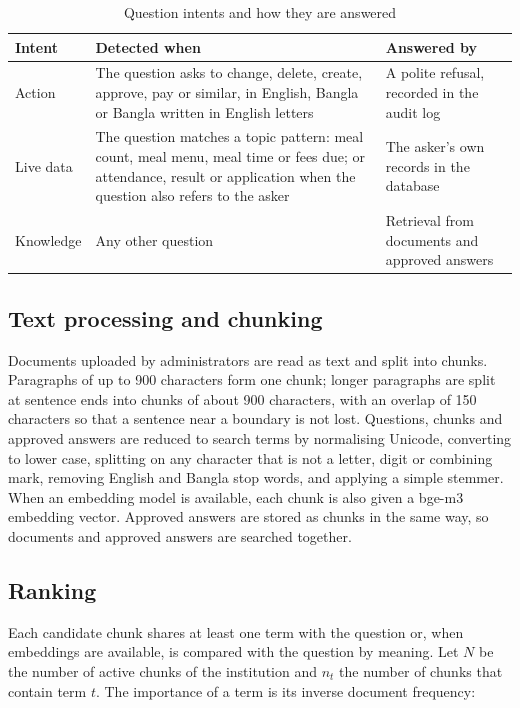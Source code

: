 \begin{table}[H]
    \centering
        \caption{Question intents and how they are answered}
        \label{tab:intents}
        \begin{tabular}{|p{2.6cm}|p{5.2cm}|p{5.2cm}|}
        \hline
        \textbf{Intent} & \textbf{Detected when} & \textbf{Answered by}\\
        \hline
        Action & The question asks to change, delete, create, approve, pay or similar, in English, Bangla or Bangla written in English letters & A polite refusal, recorded in the audit log \\
        \hline
        Live data & The question matches a topic pattern: meal count, meal menu, meal time or fees due; or attendance, result or application when the question also refers to the asker & The asker's own records in the database \\
        \hline
        Knowledge & Any other question & Retrieval from documents and approved answers \\
        \hline
        \end{tabular}
\end{table}

\subsection{Text processing and chunking}
Documents uploaded by administrators are read as text and split into chunks. Paragraphs of up to 900 characters form one chunk; longer paragraphs are split at sentence ends into chunks of about 900 characters, with an overlap of 150 characters so that a sentence near a boundary is not lost. Questions, chunks and approved answers are reduced to search terms by normalising Unicode, converting to lower case, splitting on any character that is not a letter, digit or combining mark, removing English and Bangla stop words, and applying a simple stemmer. When an embedding model is available, each chunk is also given a bge-m3 embedding vector. Approved answers are stored as chunks in the same way, so documents and approved answers are searched together.

\subsection{Ranking}
Each candidate chunk shares at least one term with the question or, when embeddings are available, is compared with the question by meaning. Let $N$ be the number of active chunks of the institution and $n_t$ the number of chunks that contain term $t$. The importance of a term is its inverse document frequency:

